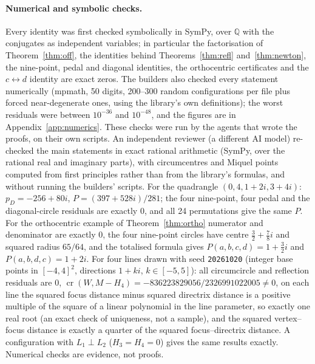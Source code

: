 \documentclass[11pt]{article}
\theoremstyle{definition}
\theoremstyle{remark}
\begin{document}
\paragraph{Numerical and symbolic checks.} Every identity was first checked symbolically in SymPy, over
$\mathbb{Q}$ with the conjugates as independent variables; in particular the factorisation of
Theorem~\ref{thm:off}, the identities behind Theorems~\ref{thm:refl} and~\ref{thm:newton}, the
nine-point, pedal and diagonal identities, the orthocentric certificates and the $c\leftrightarrow d$
identity are exact zeros. The builders also checked every statement numerically (mpmath, 50 digits, 200--300 random
configurations per file plus forced near-degenerate ones, using the library's own definitions); the
worst residuals were between $10^{-36}$ and $10^{-48}$, and the figures are in
Appendix~\ref{app:numerics}. These checks were run by the agents that wrote the proofs, on their own scripts. An independent
reviewer (a different AI model) re-checked the main statements in exact rational arithmetic (SymPy, over
the rational real and imaginary parts), with circumcentres and Miquel points computed from first
principles rather than from the library's formulas, and without running the builders' scripts. For the
quadrangle $(0,4,1+2i,3+4i)$: $p_D=-256+80i$, $P=(397+528i)/281$; the four nine-point, four pedal and
the diagonal-circle residuals are exactly $0$, and all 24 permutations give the same $P$. For the
orthocentric example of Theorem~\ref{thm:ortho} numerator and denominator are exactly $0$, the four
nine-point circles have centre $\tfrac32+\tfrac78i$ and squared radius $65/64$, and the totalised
formula gives $P(a,b,c,d)=1+\tfrac32i$ and $P(a,b,d,c)=1+2i$. For four lines drawn with seed
\texttt{20261020} (integer base points in $[-4,4]^2$, directions $1+ki$, $k\in[-5,5]$): all
circumcircle and reflection residuals are $0$, $\operatorname{cr}(W,M-H_4)=-836223829056/2326991022005\neq0$,
on each line the squared focus distance minus squared directrix distance is a positive multiple of the
square of a linear polynomial in the line parameter, so exactly one real root (an exact check of
uniqueness, not a sample), and the squared vertex--focus distance is exactly a quarter of the squared
focus--directrix distance. A configuration with $L_1\perp L_2$ ($H_3=H_4=0$) gives the same results
exactly. Numerical checks are evidence, not proofs.
\end{document}
